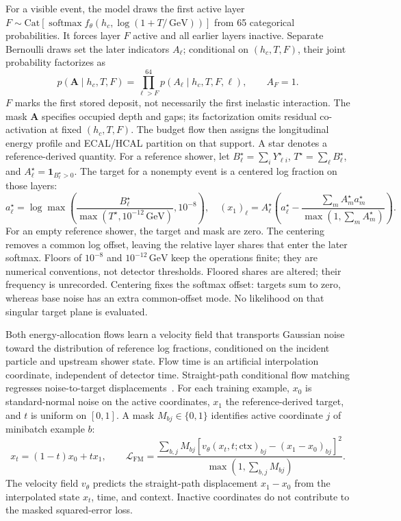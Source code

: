 \documentclass[11pt]{article}
\newcommand{\GeV}{\,\mathrm{GeV}}
\begin{document}
For a visible event, the model draws the first active layer $F\sim\mathrm{Cat}[\operatorname{softmax}f_\theta(h_c,\log(1+T/\GeV))]$ from 65 categorical probabilities. It forces layer $F$ active and all earlier layers inactive. Separate Bernoulli draws set the later indicators $A_\ell$; conditional on $(h_c,T,F)$, their joint probability factorizes as
\begin{equation}
 p(\mathbf A\mid h_c,T,F)=\prod_{\ell>F}^{64}p(A_\ell\mid h_c,T,F,\ell),
 \qquad A_F=1.
 \label{eq:activity}
\end{equation}
$F$ marks the first stored deposit, not necessarily the first inelastic interaction. The mask $\mathbf A$ specifies occupied depth and gaps; its factorization omits residual co-activation at fixed $(h_c,T,F)$. The budget flow then assigns the longitudinal energy profile and ECAL/HCAL partition on that support. A star denotes a reference-derived quantity. For a reference shower, let $B_\ell^\star=\sum_iY_{\ell i}^\star$, $T^\star=\sum_\ell B_\ell^\star$, and $A_\ell^\star=\mathbf 1_{B_\ell^\star>0}$. The target for a nonempty event is a centered log fraction on those layers:
\begin{equation}
 a_\ell^\star=\log\max\!\left(
 \frac{B_\ell^\star}{\max(T^\star,10^{-12}\GeV)},10^{-8}\right),
 \quad (x_1)_\ell=A_\ell^\star\left(
 a_\ell^\star-\frac{\sum_m A_m^\star a_m^\star}
 {\max(1,\sum_m A_m^\star)}\right).
 \label{eq:profile_target}
\end{equation}
For an empty reference shower, the target and mask are zero. The centering removes a common log offset, leaving the relative layer shares that enter the later softmax. Floors of $10^{-8}$ and $10^{-12}\GeV$ keep the operations finite; they are numerical conventions, not detector thresholds. Floored shares are altered; their frequency is unrecorded. Centering fixes the softmax offset: targets sum to zero, whereas base noise has an extra common-offset mode. No likelihood on that singular target plane is evaluated.

Both energy-allocation flows learn a velocity field that transports Gaussian noise toward the distribution of reference log fractions, conditioned on the incident particle and upstream shower state. Flow time is an artificial interpolation coordinate, independent of detector time. Straight-path conditional flow matching regresses noise-to-target displacements~\cite{flowmatching,rectifiedflow}. For each training example, $x_0$ is standard-normal noise on the active coordinates, $x_1$ the reference-derived target, and $t$ is uniform on $[0,1]$. A mask $M_{bj}\in\{0,1\}$ identifies active coordinate $j$ of minibatch example $b$:
\begin{equation}
 x_t=(1-t)x_0+t x_1,\qquad
 \mathcal L_{\mathrm{FM}}=
 \frac{\sum_{b,j}M_{bj}
 [v_\theta(x_t,t;\mathrm{ctx})_{bj}-(x_1-x_0)_{bj}]^2}
 {\max(1,\sum_{b,j}M_{bj})}.
 \label{eq:cfm}
\end{equation}
The velocity field $v_\theta$ predicts the straight-path displacement $x_1-x_0$ from the interpolated state $x_t$, time, and context. Inactive coordinates do not contribute to the masked squared-error loss.
\end{document}
